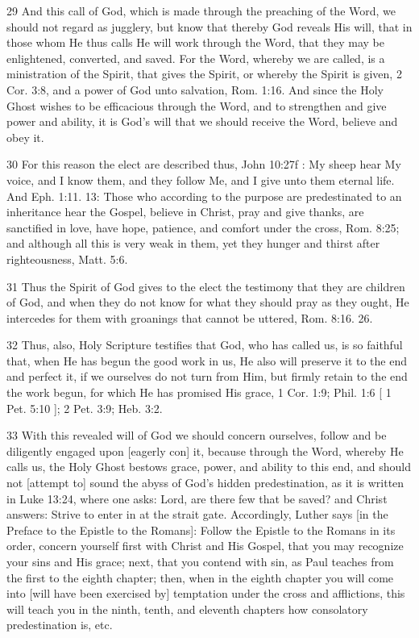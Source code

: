 {29 And this call of God, which is made through the preaching of the Word, we should not regard as jugglery, but know that thereby God reveals His will, that in those whom He thus calls He will work through the Word, that they may be enlightened, converted, and saved. For the Word, whereby we are called, is a ministration of the Spirit, that gives the Spirit, or whereby the Spirit is given, 2 Cor. 3:8, and a power of God unto salvation, Rom. 1:16. And since the Holy Ghost wishes to be efficacious through the Word, and to strengthen and give power and ability, it is God’s will that we should receive the Word, believe and obey it.

30 For this reason the elect are described thus, John 10:27f : My sheep hear My voice, and I know them, and they follow Me, and I give unto them eternal life. And Eph. 1:11. 13: Those who according to the purpose are predestinated to an inheritance hear the Gospel, believe in Christ, pray and give thanks, are sanctified in love, have hope, patience, and comfort under the cross, Rom. 8:25; and although all this is very weak in them, yet they hunger and thirst after righteousness, Matt. 5:6.

31 Thus the Spirit of God gives to the elect the testimony that they are children of God, and when they do not know for what they should pray as they ought, He intercedes for them with groanings that cannot be uttered, Rom. 8:16. 26.

32 Thus, also, Holy Scripture testifies that God, who has called us, is so faithful that, when He has begun the good work in us, He also will preserve it to the end and perfect it, if we ourselves do not turn from Him, but firmly retain to the end the work begun, for which He has promised His grace, 1 Cor. 1:9; Phil. 1:6 [ 1 Pet. 5:10 ]; 2 Pet. 3:9; Heb. 3:2.

33 With this revealed will of God we should concern ourselves, follow and be diligently engaged upon [eagerly con] it, because through the Word, whereby He calls us, the Holy Ghost bestows grace, power, and ability to this end, and should not [attempt to] sound the abyss of God’s hidden predestination, as it is written in Luke 13:24, where one asks: Lord, are there few that be saved? and Christ answers: Strive to enter in at the strait gate. Accordingly, Luther says [in the Preface to the Epistle to the Romans]: Follow the Epistle to the Romans in its order, concern yourself first with Christ and His Gospel, that you may recognize your sins and His grace; next, that you contend with sin, as Paul teaches from the first to the eighth chapter; then, when in the eighth chapter you will come into [will have been exercised by] temptation under the cross and afflictions, this will teach you in the ninth, tenth, and eleventh chapters how consolatory predestination is, etc.

}
